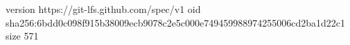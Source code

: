 version https://git-lfs.github.com/spec/v1
oid sha256:6bdd0c098f915b38009ecb9078c2e5c000e749459988974255006cd2ba1d22c1
size 571
